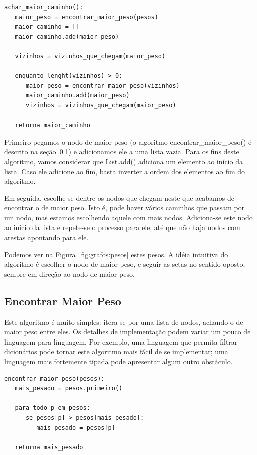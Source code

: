 \documentclass[12pt]{article}
\begin{document}
\begin{lstlisting}
achar_maior_caminho():
   maior_peso = encontrar_maior_peso(pesos)
   maior_caminho = []
   maior_caminho.add(maior_peso)

   vizinhos = vizinhos_que_chegam(maior_peso)

   enquanto lenght(vizinhos) > 0:
      maior_peso = encontrar_maior_peso(vizinhos)
      maior_caminho.add(maior_peso)
      vizinhos = vizinhos_que_chegam(maior_peso)

   retorna maior_caminho
\end{lstlisting}

Primeiro pegamos o nodo de maior peso (o algoritmo {\sf encontrar\_maior\_peso()} é descrito na se\c{c}ão~\ref{sec:algoritmos:encontrar-maior-peso}) e adicionamos ele a uma lista vazia. Para os fins deste algoritmo, vamos considerar que {\sf List.add()} adiciona um elemento ao início da lista. Caso ele adicione ao fim, basta inverter a ordem dos elementos ao fim do algoritmo.

Em seguida, escolhe-se dentre os nodos que chegam neste que acabamos de encontrar o de maior peso. Isto é, pode haver vários caminhos que passam por um nodo, mas estamos escolhendo aquele com mais nodos. Adiciona-se este nodo ao início da lista e repete-se o processo para ele, até que não haja nodos com arestas apontando para ele. 

Podemos ver na Figura~\ref{fig:grafos:pesos} estes pesos. A idéia intuitiva do algoritmo é escolher o nodo de maior peso, e seguir as setas no sentido oposto, sempre em direção ao nodo de maior peso.


\subsection{Encontrar Maior Peso}\label{sec:algoritmos:encontrar-maior-peso}
Este algoritmo é muito simples: itera-se por uma lista de nodos, achando o de maior peso entre eles. Os detalhes de implementa\c{c}ão podem variar um pouco de linguagem para linguagem. Por exemplo, uma linguagem que permita filtrar dicionários pode tornar este algoritmo mais fácil de se implementar; uma linguagem mais fortemente tipada pode apresentar algum outro obstáculo.

\begin{lstlisting}
encontrar_maior_peso(pesos):
   mais_pesado = pesos.primeiro()

   para todo p em pesos:
      se pesos[p] > pesos[mais_pesado]:
         mais_pesado = pesos[p]

   retorna mais_pesado
\end{lstlisting}
\end{document}

